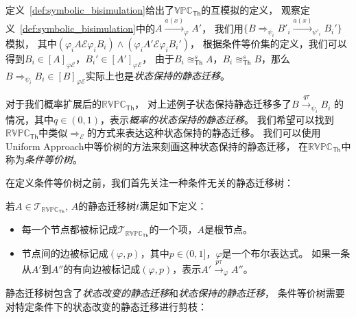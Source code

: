   定义~\ref{def:symbolic_bisimulation}给出了$\mathbb{VPC}_{\mathsf{Th}}$的互模拟的定义，
   观察定义~\ref{def:symbolic_bisimulation}中的$A\stackrel{a(x)}{\longrightarrow}_{\varphi} A'$，
   我们用$\{B\Rightarrow_{\psi_i}B'_i\stackrel{a(x)}{\longrightarrow}_{\psi'_i}B_i'\}$模拟，
   其中$(\varphi_i A\mathcal{E}\varphi_i B_i)\wedge(\varphi_i A'\mathcal{E}\varphi_i B_i')$，
   根据条件等价集的定义，我们可以得到$B_i\in [A]_{\varphi\mathcal{E}}$，$B_i'\in [A']_{\varphi \mathcal{E}}$，
   由于$B_i \approxeq_{\mathsf{Th}}^s A$，$B_i\approxeq_{\mathsf{Th}}^s B$，那么$B\Rightarrow_{\psi_i}B_i\in[B]_{\varphi\mathcal{E}}$实际上也是\textit{状态保持的静态迁移}。

   对于我们概率扩展后的$\mathbb{RVPC}_{\mathsf{Th}}$，
   对上述例子状态保持静态迁移多了$B\stackrel{q\tau}{\rightarrow}_{\psi_i} B_i$
   的情况，其中$q\in(0,1)$，表示\textit{概率的状态保持的静态迁移}。
   我们希望可以找到$\mathbb{RVPC}_{\mathsf{Th}}$中类似$\Rightarrow_{\mathcal{E}}$的方式来表达这种状态保持的静态迁移。
   我们可以使用Uniform Approach中等价树的方法来刻画这种状态保持的静态迁移，
   在$\mathbb{RVPC}_{\mathsf{Th}}$中称为\textit{条件等价树}。

   在定义条件等价树之前，我们首先关注一种条件无关的静态迁移树：
\begin{definition}[静态迁移树]
   \label{def:silent_tree}
   若$A\in \mathcal{T}_{\mathbb{RVPC}_{\mathsf{Th}}}$,
   $A$的静态迁移树$t$满足如下定义：
   \begin{itemize}
   \item 每一个节点都被标记成$\mathcal{T}_{\mathbb{RVPC}_{\mathsf{Th}}}$的一个项，$A$是根节点。
   \item {
      节点间的边被标记成$(\varphi,p)$，其中$p\in(0,1]$，$\varphi$是一个布尔表达式。
      如果一条从$A'$到$A''$的有向边被标记成$(\varphi,p)$，表示$A'\stackrel{p\tau}{\rightarrow}_{\varphi} A''$。
   }
   \end{itemize}
\end{definition}

静态迁移树包含了\textit{状态改变的静态迁移}和\textit{状态保持的静态迁移}，
条件等价树需要对特定条件下的状态改变的静态迁移进行剪枝：

